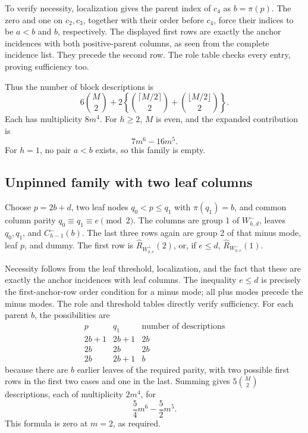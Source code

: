 \documentclass[11pt,a4paper]{article}
\theoremstyle{remark}
\newcommand{\ancR}{\widehat R}
\begin{document}
To verify necessity, localization gives the parent index of \(c_4\)
as \(b=\pi(p)\). The zero and one on \(c_2,c_3\), together with
their order before \(c_4\), force their indices to be \(a<b\) and
\(b\), respectively. The displayed first rows are exactly the
anchor incidences with both positive-parent columns, as seen from
the complete incidence list. They precede the second row. The role
table checks every entry, proving sufficiency too.

Thus the number of block descriptions is
\[
6\binom M2+
2\left\{\binom{\lceil M/2\rceil}{2}
       +\binom{\lfloor M/2\rfloor}{2}\right\}.
\]
Each has multiplicity \(8m^4\). For \(h\ge2\), \(M\) is even,
and the expanded contribution is
\begin{equation}\label{eq:pluscount}
7m^6-16m^5.
\end{equation}
For \(h=1\), no pair \(a<b\) exists, so this family is empty.

\subsection{Unpinned family with two leaf columns}
Choose \(p=2b+d\), two leaf nodes \(q_0<p\le q_1\) with
\(\pi(q_1)=b\), and common column parity
\(q_0\equiv q_1\equiv e\pmod2\).
The columns are group 1 of \(W_{h,d}^-\), leaves \(q_0,q_1\),
and \(C_{h-1}^-(b)\). The last three rows again are group 2 of
that minus mode, leaf \(p\), and dummy. The first row is
\(\ancR_{W_{h,e}^+}(2)\), or, if \(e\le d\),
\(\ancR_{W_{h,e}^-}(1)\).

Necessity follows from the leaf threshold, localization, and the fact
that these are exactly the anchor incidences with leaf columns.
The inequality \(e\le d\) is precisely the first-anchor-row order
condition for a minus mode; all plus modes precede the minus modes.
The role and threshold tables directly verify sufficiency.
For each parent \(b\), the possibilities are
\[
\begin{array}{c|c|c}
p&q_1&\text{number of descriptions}\\ \hline
2b+1&2b+1&2b\\
2b&2b&2b\\
2b&2b+1&b
\end{array}
\]
because there are \(b\) earlier leaves of the required parity,
with two possible first rows in the first two cases and one in
the last. Summing gives \(5\binom M2\) descriptions, each of
multiplicity \(2m^4\), for
\begin{equation}\label{eq:leafcount}
\frac54m^6-\frac52m^5.
\end{equation}
This formula is zero at \(m=2\), as required.
\end{document}
